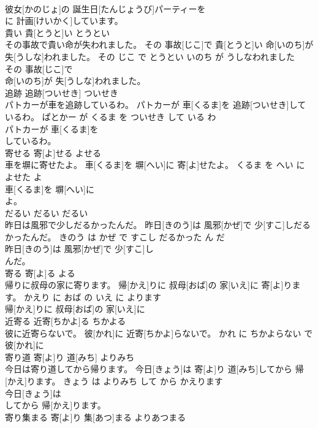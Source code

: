 \documentclass[8pt]{extreport}
\begin{document}
\begin{CJK}{UTF8}{min}
\\	彼女[かのじょ]の 誕生日[たんじょうび]パーティーを
\\	に 計画[けいかく]しています。			
\\	貴い	貴[とうと]い	とうとい	
\\	その事故で貴い命が失われました。	その 事故[じこ]で 貴[とうと]い 命[いのち]が 失[うしな]われました。	その じこ で とうとい いのち が うしなわれました	
\\	その 事故[じこ]で
\\	命[いのち]が 失[うしな]われました。			
\\	追跡	追跡[ついせき]	ついせき	
\\	パトカーが車を追跡しているわ。	パトカーが 車[くるま]を 追跡[ついせき]しているわ。	ぱとかー が くるま を ついせき して いる わ	
\\	パトカーが 車[くるま]を
\\	しているわ。			
\\	寄せる	寄[よ]せる	よせる	
\\	車を塀に寄せたよ。	車[くるま]を 塀[へい]に 寄[よ]せたよ。	くるま を へい に よせた よ	
\\	車[くるま]を 塀[へい]に
\\	よ。			
\\	だるい	だるい	だるい	
\\	昨日は風邪で少しだるかったんだ。	昨日[きのう]は 風邪[かぜ]で 少[すこ]しだるかったんだ。	きのう は かぜ で すこし だるかった ん だ	
\\	昨日[きのう]は 風邪[かぜ]で 少[すこ]し
\\	んだ。			
\\	寄る	寄[よ]る	よる	
\\	帰りに叔母の家に寄ります。	帰[かえ]りに 叔母[おば]の 家[いえ]に 寄[よ]ります。	かえり に おば の いえ に よります	
\\	帰[かえ]りに 叔母[おば]の 家[いえ]に
\\	近寄る	近寄[ちかよ]る	ちかよる	
\\	彼に近寄らないで。	彼[かれ]に 近寄[ちかよ]らないで。	かれ に ちかよらない で	
\\	彼[かれ]に
\\	寄り道	寄[よ]り 道[みち]	よりみち	
\\	今日は寄り道してから帰ります。	今日[きょう]は 寄[よ]り 道[みち]してから 帰[かえ]ります。	きょう は よりみち して から かえります	
\\	今日[きょう]は
\\	してから 帰[かえ]ります。			
\\	寄り集まる	寄[よ]り 集[あつ]まる	よりあつまる	

\end{CJK}
\end{document}
